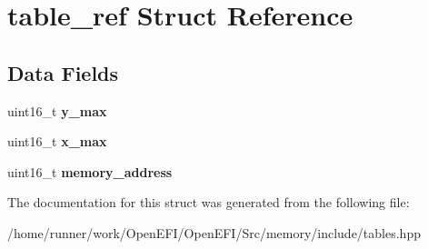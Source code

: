 \hypertarget{structtable__ref}{}\section{table\+\_\+ref Struct Reference}
\label{structtable__ref}
\subsection*{Data Fields}
\begin{DoxyCompactItemize}
\item 
\mbox{\label{structtable__ref_a0d60a4590c9e8624656d828668430c15}} 
uint16\+\_\+t {\bfseries y\+\_\+max}
\item 
\mbox{\label{structtable__ref_a53f68b2abfd2aef88f424542a81be14d}} 
uint16\+\_\+t {\bfseries x\+\_\+max}
\item 
\mbox{\label{structtable__ref_ad5e7b83975cb7a228e459107129c8f4a}} 
uint16\+\_\+t {\bfseries memory\+\_\+address}
\end{DoxyCompactItemize}


The documentation for this struct was generated from the following file\+:\begin{DoxyCompactItemize}
\item 
/home/runner/work/\+Open\+E\+F\+I/\+Open\+E\+F\+I/\+Src/memory/include/tables.\+hpp\end{DoxyCompactItemize}
